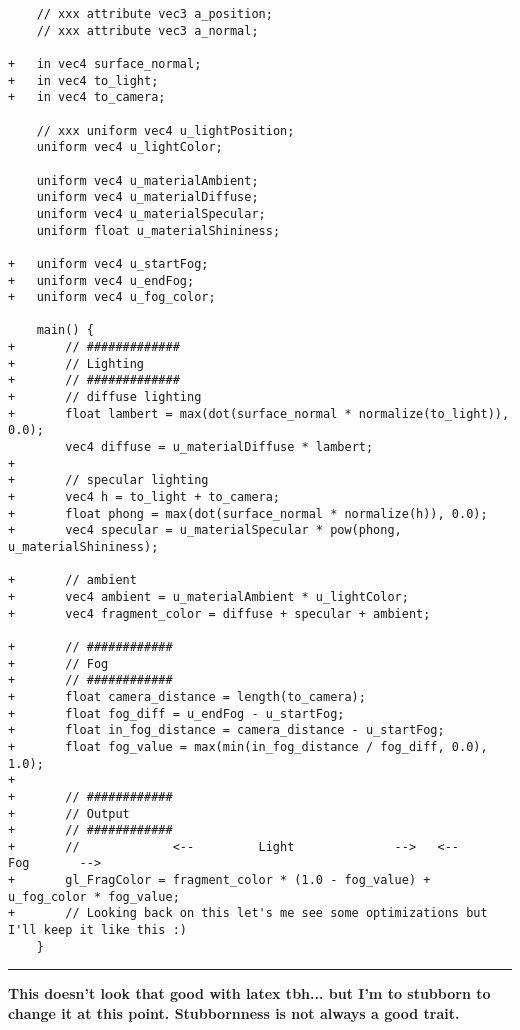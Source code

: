 \small
\begin{lstlisting}
    // xxx attribute vec3 a_position; 
    // xxx attribute vec3 a_normal; 

+   in vec4 surface_normal;
+   in vec4 to_light;
+   in vec4 to_camera;

    // xxx uniform vec4 u_lightPosition;
    uniform vec4 u_lightColor; 
 
    uniform vec4 u_materialAmbient; 
    uniform vec4 u_materialDiffuse; 
    uniform vec4 u_materialSpecular; 
    uniform float u_materialShininess; 

+   uniform vec4 u_startFog;
+   uniform vec4 u_endFog;
+   uniform vec4 u_fog_color;

    main() {
+       // #############
+       // Lighting
+       // #############
+       // diffuse lighting
+       float lambert = max(dot(surface_normal * normalize(to_light)), 0.0);
        vec4 diffuse = u_materialDiffuse * lambert;
+
+       // specular lighting
+       vec4 h = to_light + to_camera;
+       float phong = max(dot(surface_normal * normalize(h)), 0.0);
+       vec4 specular = u_materialSpecular * pow(phong, u_materialShininess);

+       // ambient
+       vec4 ambient = u_materialAmbient * u_lightColor;
+       vec4 fragment_color = diffuse + specular + ambient;

+       // ############
+       // Fog
+       // ############
+       float camera_distance = length(to_camera);
+       float fog_diff = u_endFog - u_startFog;
+       float in_fog_distance = camera_distance - u_startFog;
+       float fog_value = max(min(in_fog_distance / fog_diff, 0.0), 1.0);
+
+       // ############
+       // Output
+       // ############
+       //             <--         Light              -->   <--       Fog       -->
+       gl_FragColor = fragment_color * (1.0 - fog_value) + u_fog_color * fog_value;
+       // Looking back on this let's me see some optimizations but I'll keep it like this :)
    }
\end{lstlisting}
\normalsize

\rule{\textwidth}{0.2mm}

\textbf{This doesn't look that good with latex tbh... but I'm to stubborn to change it at this point. Stubbornness is not always a good trait.}